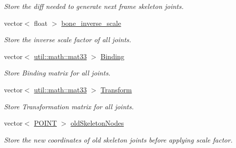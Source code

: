\begin{DoxyCompactItemize}
\begin{DoxyCompactList}\small\item\em \-Store the diff needed to generate next frame skeleton joints. \end{DoxyCompactList}\item 
\hypertarget{classDrawnSkeleton_ab0f7ec52b128c90a8593287776bacb6e}{vector$<$ float $>$ \hyperlink{classDrawnSkeleton_ab0f7ec52b128c90a8593287776bacb6e}{bone\-\_\-inverse\-\_\-scale}}\label{classDrawnSkeleton_ab0f7ec52b128c90a8593287776bacb6e}

\begin{DoxyCompactList}\small\item\em \-Store the inverse scale factor of all joints. \end{DoxyCompactList}\item 
\hypertarget{classDrawnSkeleton_ab438fd7fadc23f3dd48d963544b793af}{vector$<$ \hyperlink{classutil_1_1math_1_1mat33}{util\-::math\-::mat33} $>$ \hyperlink{classDrawnSkeleton_ab438fd7fadc23f3dd48d963544b793af}{\-Binding}}\label{classDrawnSkeleton_ab438fd7fadc23f3dd48d963544b793af}

\begin{DoxyCompactList}\small\item\em \-Store \-Binding matrix for all joints. \end{DoxyCompactList}\item 
\hypertarget{classDrawnSkeleton_ac220e0fe2ed0957aa7ee4adc9486912d}{vector$<$ \hyperlink{classutil_1_1math_1_1mat33}{util\-::math\-::mat33} $>$ \hyperlink{classDrawnSkeleton_ac220e0fe2ed0957aa7ee4adc9486912d}{\-Transform}}\label{classDrawnSkeleton_ac220e0fe2ed0957aa7ee4adc9486912d}

\begin{DoxyCompactList}\small\item\em \-Store \-Transformation matrix for all joints. \end{DoxyCompactList}\item 
\hypertarget{classDrawnSkeleton_a8dc97fc7686f67159e8fa6b24bff4e39}{vector$<$ \hyperlink{structPOINT}{\-P\-O\-I\-N\-T} $>$ \hyperlink{classDrawnSkeleton_a8dc97fc7686f67159e8fa6b24bff4e39}{old\-Skeleton\-Nodes}}\label{classDrawnSkeleton_a8dc97fc7686f67159e8fa6b24bff4e39}

\begin{DoxyCompactList}\small\item\em \-Store the new coordinates of old skeleton joints before applying scale factor. \end{DoxyCompactList}\end{DoxyCompactItemize}


